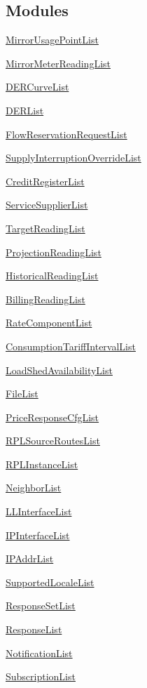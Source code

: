 \subsection*{Modules}
\begin{DoxyCompactItemize}
\item 
\hyperlink{group__MirrorUsagePointList}{Mirror\+Usage\+Point\+List}
\item 
\hyperlink{group__MirrorMeterReadingList}{Mirror\+Meter\+Reading\+List}
\item 
\hyperlink{group__DERCurveList}{D\+E\+R\+Curve\+List}
\item 
\hyperlink{group__DERList}{D\+E\+R\+List}
\item 
\hyperlink{group__FlowReservationRequestList}{Flow\+Reservation\+Request\+List}
\item 
\hyperlink{group__SupplyInterruptionOverrideList}{Supply\+Interruption\+Override\+List}
\item 
\hyperlink{group__CreditRegisterList}{Credit\+Register\+List}
\item 
\hyperlink{group__ServiceSupplierList}{Service\+Supplier\+List}
\item 
\hyperlink{group__TargetReadingList}{Target\+Reading\+List}
\item 
\hyperlink{group__ProjectionReadingList}{Projection\+Reading\+List}
\item 
\hyperlink{group__HistoricalReadingList}{Historical\+Reading\+List}
\item 
\hyperlink{group__BillingReadingList}{Billing\+Reading\+List}
\item 
\hyperlink{group__RateComponentList}{Rate\+Component\+List}
\item 
\hyperlink{group__ConsumptionTariffIntervalList}{Consumption\+Tariff\+Interval\+List}
\item 
\hyperlink{group__LoadShedAvailabilityList}{Load\+Shed\+Availability\+List}
\item 
\hyperlink{group__FileList}{File\+List}
\item 
\hyperlink{group__PriceResponseCfgList}{Price\+Response\+Cfg\+List}
\item 
\hyperlink{group__RPLSourceRoutesList}{R\+P\+L\+Source\+Routes\+List}
\item 
\hyperlink{group__RPLInstanceList}{R\+P\+L\+Instance\+List}
\item 
\hyperlink{group__NeighborList}{Neighbor\+List}
\item 
\hyperlink{group__LLInterfaceList}{L\+L\+Interface\+List}
\item 
\hyperlink{group__IPInterfaceList}{I\+P\+Interface\+List}
\item 
\hyperlink{group__IPAddrList}{I\+P\+Addr\+List}
\item 
\hyperlink{group__SupportedLocaleList}{Supported\+Locale\+List}
\item 
\hyperlink{group__ResponseSetList}{Response\+Set\+List}
\item 
\hyperlink{group__ResponseList}{Response\+List}
\item 
\hyperlink{group__NotificationList}{Notification\+List}
\item 
\hyperlink{group__SubscriptionList}{Subscription\+List}
\end{DoxyCompactItemize}
